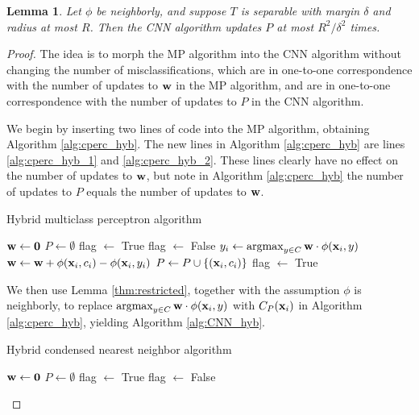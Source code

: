 \documentclass{article}
\newcommand{\argmax}{\operatornamewithlimits{argmax}}
\newtheorem{lemma}{Lemma}
\begin{document}
\begin{lemma}
\label{thm:mainlemma}
Let $\phi$ be neighborly, and suppose $T$ is separable with margin $\delta$ and radius at most $R$. Then the CNN algorithm updates $P$ at most $R^2 / \delta^2$ times.
\end{lemma}
\begin{proof}
The idea is to morph the MP algorithm into the CNN algorithm without changing the number of misclassifications, which are in one-to-one correspondence with the number of updates to ${\bf w}$ in the MP algorithm, and are in one-to-one correspondence with the number of updates to $P$ in the CNN algorithm.

We begin by inserting two lines of code into the MP algorithm, obtaining Algorithm \ref{alg:cperc_hyb}. The new lines in Algorithm \ref{alg:cperc_hyb} are lines \ref{alg:cperc_hyb_1} and \ref{alg:cperc_hyb_2}. These lines clearly have no effect on the number of updates to ${\bf w}$, but note in Algorithm \ref{alg:cperc_hyb} the number of updates to $P$ equals the number of updates to ${\bf w}$.
\begin{algorithm}[h!]
\caption{Hybrid multiclass perceptron algorithm}
\label{alg:cperc_hyb}
\begin{algorithmic}[1]
\STATE ${\bf w} \leftarrow {\bf 0}$
\STATE $P \leftarrow \emptyset$ \label{alg:cperc_hyb_1}
\STATE flag $\leftarrow$ True
\STATE flag $\leftarrow$ False
	\STATE $y_i \gets \argmax_{y \in C} {\bf w} \cdot \phi({\bf x}_i,y)$
		\STATE ${\bf w} \leftarrow {\bf w} + \phi({\bf x}_i,c_i)-\phi({\bf x}_i,y_i)$
		\STATE $P \leftarrow P \cup \{({\bf x}_i , c_i)\}$ \label{alg:cperc_hyb_2}
		\STATE flag $\leftarrow$ True
	\ENDIF
\ENDFOR
\ENDWHILE
\end{algorithmic}
\end{algorithm}
We then use Lemma \ref{thm:restricted}, together with the assumption $\phi$ is neighborly, to replace $\argmax_{y \in C} {\bf w} \cdot \phi({\bf x}_i,y)$ with $C_P({\bf x}_i)$ in Algorithm \ref{alg:cperc_hyb}, yielding Algorithm \ref{alg:CNN_hyb}.
\begin{algorithm}[h!]
\caption{Hybrid condensed nearest neighbor algorithm}
\label{alg:CNN_hyb}
\begin{algorithmic}[1]
\STATE ${\bf w} \leftarrow {\bf 0}$ \label{alg:CNN_hyb_1}
\STATE $P \leftarrow \emptyset$
\STATE flag $\leftarrow$ True
\STATE flag $\leftarrow$ False

\end{algorithmic}
\end{algorithm}
\end{proof}
\end{document}
